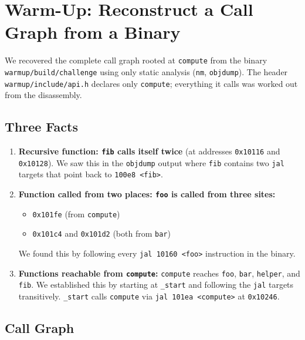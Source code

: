 \documentclass[11pt,a4paper]{article}
\begin{document}
\section{Warm-Up: Reconstruct a Call Graph from a Binary}

We recovered the complete call graph rooted at \texttt{compute} from the binary \texttt{warmup/build/challenge} using only static analysis (\texttt{nm}, \texttt{objdump}). The header \texttt{warmup/include/api.h} declares only \texttt{compute}; everything it calls was worked out from the disassembly.

\subsection{Three Facts}

\begin{enumerate}[leftmargin=*]
\item \textbf{Recursive function: \texttt{fib} calls itself twice} (at addresses \texttt{0x10116} and \texttt{0x10128}). We saw this in the \texttt{objdump} output where \texttt{fib} contains two \texttt{jal} targets that point back to \texttt{100e8 <fib>}.

\item \textbf{Function called from two places: \texttt{foo} is called from three sites:}
\begin{itemize}
  \item \texttt{0x101fe} (from \texttt{compute})
  \item \texttt{0x101c4} and \texttt{0x101d2} (both from \texttt{bar})
\end{itemize}
We found this by following every \texttt{jal 10160 <foo>} instruction in the binary.

\item \textbf{Functions reachable from \texttt{compute}:} \texttt{compute} reaches \texttt{foo}, \texttt{bar}, \texttt{helper}, and \texttt{fib}. We established this by starting at \texttt{\_start} and following the \texttt{jal} targets transitively. \texttt{\_start} calls \texttt{compute} via \texttt{jal 101ea <compute>} at \texttt{0x10246}.
\end{enumerate}

\subsection{Call Graph}
\end{document}
